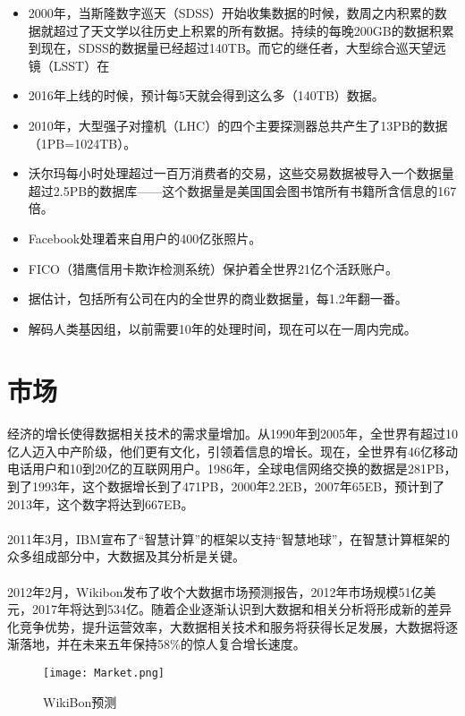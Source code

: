 \documentclass[12pt]{article}
\begin{document}
\begin{itemize}
\item
2000年，当斯隆数字巡天（SDSS）开始收集数据的时候，数周之内积累的数据就超过了天文学以往历史上积累的所有数据。持续的每晚200GB的数据积累到现在，SDSS的数据量已经超过140TB。而它的继任者，大型综合巡天望远镜（LSST）在

\item
2016年上线的时候，预计每5天就会得到这么多（140TB）数据。

\item
2010年，大型强子对撞机（LHC）的四个主要探测器总共产生了13PB的数据（1PB=1024TB）。

\item
沃尔玛每小时处理超过一百万消费者的交易，这些交易数据被导入一个数据量超过2.5PB的数据库——这个数据量是美国国会图书馆所有书籍所含信息的167倍。

\item
Facebook处理着来自用户的400亿张照片。

\item
FICO（猎鹰信用卡欺诈检测系统）保护着全世界21亿个活跃账户。

\item
据估计，包括所有公司在内的全世界的商业数据量，每1.2年翻一番。

\item
解码人类基因组，以前需要10年的处理时间，现在可以在一周内完成。
\end{itemize}

\newpage

\section{市场}
\paragraph{}
经济的增长使得数据相关技术的需求量增加。从1990年到2005年，全世界有超过10亿人迈入中产阶级，他们更有文化，引领着信息的增长。现在，全世界有46亿移动电话用户和10到20亿的互联网用户。1986年，全球电信网络交换的数据是281PB，到了1993年，这个数据增长到了471PB，2000年2.2EB，2007年65EB，预计到了2013年，这个数字将达到667EB。

\paragraph{}
2011年3月，IBM宣布了“智慧计算”的框架以支持“智慧地球”，在智慧计算框架的众多组成部分中，大数据及其分析是关键。

\paragraph{}
2012年2月，Wikibon发布了收个大数据市场预测报告，2012年市场规模51亿美元，2017年将达到534亿。随着企业逐渐认识到大数据和相关分析将形成新的差异化竞争优势，提升运营效率，大数据相关技术和服务将获得长足发展，大数据将逐渐落地，并在未来五年保持58\%的惊人复合增长速度。
\begin{figure}[htbp]
\small
\centering
\texttt{[image: Market.png]}
\caption{WikiBon预测}
\label{fig:WikiBon}
\end{figure}
\end{document}
